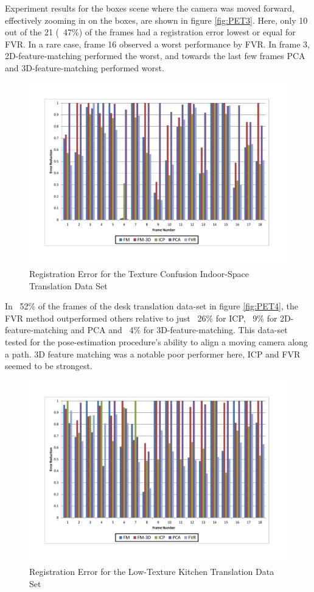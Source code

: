Experiment results for the boxes scene where the camera was moved forward, effectively zooming in on the boxes, are shown in figure \ref{fig:PET3}. Here, only 10 out of the 21 (~47\%) of the frames had a registration error lowest or equal for FVR. In a rare case, frame 16 observed a worst performance by FVR. In frame 3, 2D-feature-matching performed the worst, and towards the last few frames PCA and 3D-feature-matching performed worst.

\begin{figure}[t]
\centering
\includegraphics[width=6.0in]{images/results/IndoorSpace_texture_confusion_translation}
\caption{Registration Error for the Texture Confusion Indoor-Space Translation Data Set}
\label{fig:PET5}
\end{figure}

In ~52\% of the frames of the desk translation data-set in figure \ref{fig:PET4}, the FVR method outperformed others relative to just ~26\% for ICP, ~9\% for 2D-feature-matching and PCA and ~4\% for 3D-feature-matching. This data-set tested for the pose-estimation procedure's ability to align a moving camera along a path. 3D feature matching was a notable poor performer here, ICP and FVR seemed to be strongest. 


\begin{figure}[t]
\centering
\includegraphics[width=6.0in]{images/results/Kitchen_LittleTexture_Pan}
\caption{Registration Error for the Low-Texture Kitchen Translation Data Set}
\label{fig:PET6}
\end{figure}

